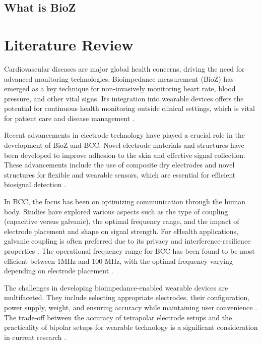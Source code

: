 \fi
\subsection{What is BioZ}

\section{Literature Review}
{
Cardiovascular diseases are major global health concerns, driving the need for advanced monitoring technologies. Bioimpedance measurement (BioZ) has emerged as a key technique for non-invasively monitoring heart rate, blood pressure, and other vital signs. Its integration into wearable devices offers the potential for continuous health monitoring outside clinical settings, which is vital for patient care and disease management \cite{OriginalSource1, towards, NewSource1}.

Recent advancements in electrode technology have played a crucial role in the development of BioZ and BCC. Novel electrode materials and structures have been developed to improve adhesion to the skin and effective signal collection. These advancements include the use of composite dry electrodes and novel structures for flexible and wearable sensors, which are essential for efficient biosignal detection \cite{PubMedArticle, NewSource2}.

In BCC, the focus has been on optimizing communication through the human body. Studies have explored various aspects such as the type of coupling (capacitive versus galvanic), the optimal frequency range, and the impact of electrode placement and shape on signal strength. For eHealth applications, galvanic coupling is often preferred due to its privacy and interference-resilience properties \cite{electrode_comp, NewSource3}. The operational frequency range for BCC has been found to be most efficient between 1MHz and 100 MHz, with the optimal frequency varying depending on electrode placement \cite{electrode_comp, NewSource4}.

The challenges in developing bioimpedance-enabled wearable devices are multifaceted. They include selecting appropriate electrodes, their configuration, power supply, weight, and ensuring accuracy while maintaining user convenience \cite{OriginalSource1, towards, NewSource5}. The trade-off between the accuracy of tetrapolar electrode setups and the practicality of bipolar setups for wearable technology is a significant consideration in current research \cite{towards, NewSource6}.

}
